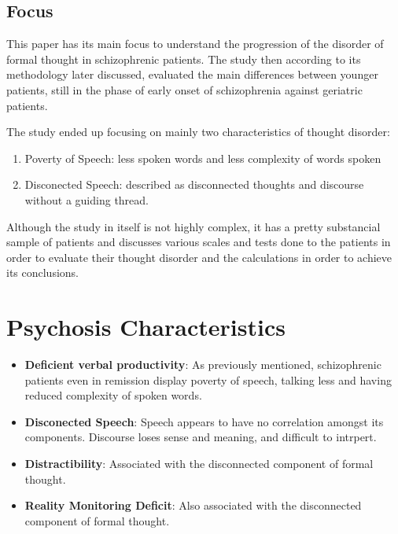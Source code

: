 \documentclass{Paper_Summary}
\begin{document}
\makepapertitle

\breakline

\begin{center}
    \section*{Focus}
\end{center}
    This paper has its main focus to understand the progression of the disorder of formal thought in schizophrenic patients. The study then according to its methodology later discussed, evaluated the main differences between younger patients, still in the phase of early onset of schizophrenia against geriatric patients.

    The study ended up focusing on mainly two characteristics of thought disorder:
    \begin{enumerate}
        \item Poverty of Speech: less spoken words and less complexity of words spoken
        \item Disconected Speech: described as disconnected thoughts and discourse without a guiding thread.
    \end{enumerate}

    Although the study in itself is not highly complex, it has a pretty substancial sample of patients and discusses various scales and tests done to the patients in order to evaluate their thought disorder and the calculations in order to achieve its conclusions.

\breakline

\newpage

\section{Psychosis Characteristics}
    \begin{itemize}
        \item \textbf{Deficient verbal productivity}: As previously mentioned, schizophrenic patients even in remission display poverty of speech, talking less and having reduced complexity of spoken words.
        \item \textbf{Disconected Speech}: Speech appears to have no correlation amongst its components. Discourse loses sense and meaning, and difficult to intrpert.
        \item \textbf{Distractibility}: Associated with the disconnected component of formal thought.
        \item \textbf{Reality Monitoring Deficit}: Also associated with the disconnected component of formal thought.
    \end{itemize}
\end{document}
